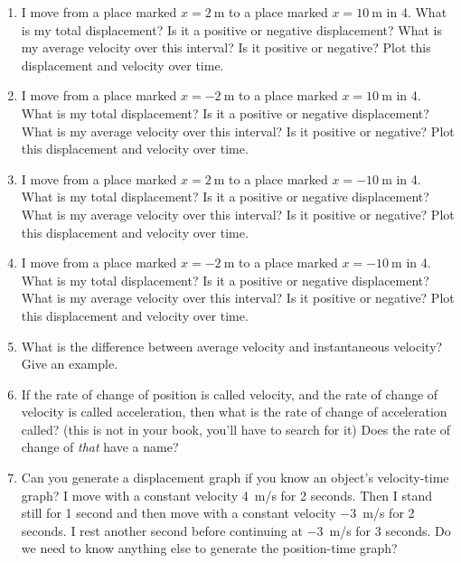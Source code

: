 \begin{enumerate}
\setlength\itemsep{1 in}

\item I move from a place marked $x=\SI{2}{\meter}$ to a place marked $x=\SI{10}{\meter}$ in \SI{4}{\sec}. What is my total displacement? Is it a positive or negative displacement? What is my average velocity over this interval? Is it positive or negative? Plot this displacement and velocity over time. \bigskip

\item I move from a place marked $x=\SI{-2}{\meter}$ to a place marked $x=\SI{10}{\meter}$ in \SI{4}{\sec}. What is my total displacement? Is it a positive or negative displacement? What is my average velocity over this interval? Is it positive or negative? Plot this displacement and velocity over time. \bigskip

\item I move from a place marked $x=\SI{2}{\meter}$ to a place marked $x=\SI{-10}{\meter}$ in \SI{4}{\sec}. What is my total displacement? Is it a positive or negative displacement? What is my average velocity over this interval? Is it positive or negative? Plot this displacement and velocity over time. \bigskip

\item I move from a place marked $x=\SI{-2}{\meter}$ to a place marked $x=\SI{-10}{\meter}$ in \SI{4}{\sec}. What is my total displacement? Is it a positive or negative displacement? What is my average velocity over this interval? Is it positive or negative? Plot this displacement and velocity over time. \bigskip

\item What is the difference between average velocity and instantaneous velocity? Give an example.

\item If the rate of change of position is called velocity, and the rate of change of velocity is called acceleration, then what is the rate of change of acceleration called? (this is not in your book, you'll have to search for it) Does the rate of change of \emph{that} have a name?

\item Can you generate a displacement graph if you know an object’s velocity-time graph? I move with a constant velocity \SI{+4}{m/s} for 2 seconds. Then I stand still for 1 second and then move with a constant velocity \SI{-3}{m/s} for 2 seconds. I rest another second before continuing at \SI{-3}{m/s} for 3 seconds. Do we need to know anything else to generate the position-time graph? \bigskip


\end{enumerate}
